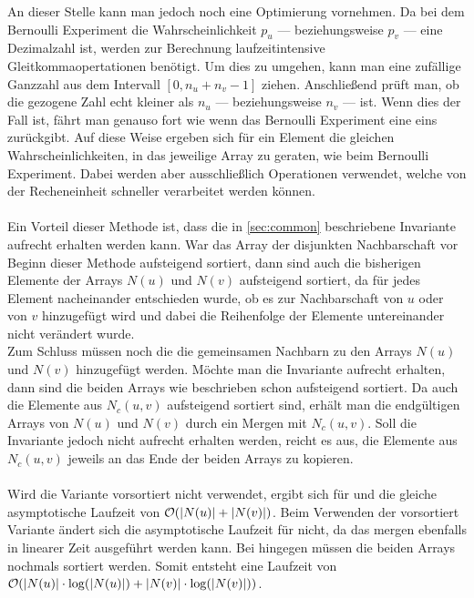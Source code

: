 An dieser Stelle  kann man jedoch noch eine Optimierung vornehmen.
Da bei dem Bernoulli Experiment die Wahrscheinlichkeit $p_{u}$ --- beziehungsweise $p_{v}$ --- eine
Dezimalzahl ist, werden zur Berechnung laufzeitintensive Gleitkommaopertationen 
benötigt. Um dies zu umgehen, kann man eine zufällige Ganzzahl aus dem Intervall
$[0, n_{u} + n_{v}-1]$ ziehen. Anschließend prüft man, ob die gezogene Zahl echt kleiner als $n_{u}$ ---
beziehungsweise $n_{v}$ ---
ist. Wenn dies der Fall ist, fährt man genauso fort wie wenn das Bernoulli Experiment eine eins
zurückgibt. Auf diese Weise 
ergeben sich für ein Element die gleichen Wahrscheinlichkeiten, in das jeweilige Array zu geraten, wie
beim Bernoulli Experiment. Dabei werden aber ausschließlich  Operationen verwendet, welche
von der Recheneinheit schneller verarbeitet werden können.
\\

\\
Ein Vorteil dieser Methode ist, dass die in \ref{sec:common} beschriebene Invariante aufrecht erhalten werden kann.
War das Array der disjunkten Nachbarschaft vor Beginn dieser Methode aufsteigend sortiert,
dann sind auch die bisherigen Elemente der Arrays $N(u)$ und $N(v)$ aufsteigend sortiert, da für jedes
Element nacheinander entschieden wurde, ob es zur Nachbarschaft von $u$ oder von $v$ hinzugefügt wird und dabei die
Reihenfolge der Elemente untereinander nicht verändert wurde.
\\
Zum Schluss müssen noch die die gemeinsamen Nachbarn zu den Arrays $N(u)$ und $N(v)$ hinzugefügt werden.
Möchte man die Invariante aufrecht erhalten, dann sind die beiden Arrays wie beschrieben schon
aufsteigend sortiert. Da auch die Elemente aus $N_{c}(u,v)$ aufsteigend sortiert sind, erhält man
die endgültigen Arrays von $N(u)$ und $N(v)$ durch ein Mergen mit $N_{c}(u,v)$. Soll die Invariante jedoch
nicht aufrecht erhalten werden, reicht es aus, die Elemente aus $N_{c}(u,v)$ jeweils an das Ende der beiden Arrays
zu kopieren.
\\
\\
Wird die Variante vorsortiert nicht verwendet, ergibt sich für \perm{} und \distr{}
die gleiche asymptotische Laufzeit von $\mathcal{O}(|N(u)| + |N(v)|)$. 
Beim Verwenden der vorsortiert Variante ändert sich die asymptotische Laufzeit für \distr{}
nicht, da das mergen ebenfalls in linearer Zeit ausgeführt werden kann. Bei \perm{}
hingegen müssen die beiden Arrays nochmals sortiert werden. Somit entsteht
eine Laufzeit von $\mathcal{O}(|N(u)| \cdot \log(|N(u)|) + |N(v)| \cdot \log(|N(v)|))$.


